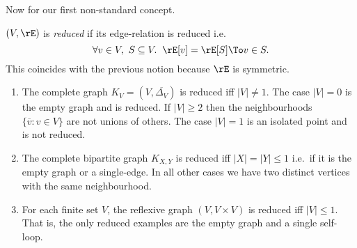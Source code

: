 \documentclass{article}
\begin{document}
\smallskip
Now for our first non-standard concept.

\begin{definition}
  $(V,\rE)$ is \emph{reduced} if its edge-relation is reduced i.e.\
  \[
  \forall v \in V,\ S \subseteq V. \;\; \rE[v] = \rE[S] \To v \in S.
  \]
  This coincides with the previous notion because $\rE$ is symmetric. \endbox
\end{definition}

\begin{example}
  \item
  \begin{enumerate}[1.]
  \item
  The complete graph $K_V = (V,\overline{\Delta_V})$ is reduced iff $|V| \neq 1$. The case $|V| = 0$ is the empty graph and is reduced. If $|V| \geq 2$ then the neighbourhoods $\{ \overline{v} : v \in V \}$ are not  unions of others. The case $|V| = 1$ is an isolated point and is not reduced.
  
  \item
  The complete bipartite graph $K_{X,Y}$ is reduced iff $|X| = |Y| \leq 1$ i.e.\ if it is the empty graph or a single-edge. In all other cases we have two distinct vertices with the same neighbourhood.
  
  \item
  For each finite set $V$, the reflexive graph $(V, V \times V)$ is reduced iff $|V| \leq 1$. That is, the only reduced examples are the empty graph and a single self-loop.


\end{enumerate}
\end{example}
\end{document}
